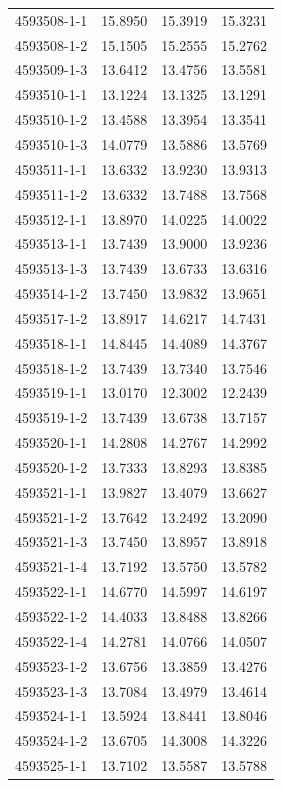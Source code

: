 \begin{longtable}{lrrr}
4593508-1-1 & 15.8950 & 15.3919 & 15.3231 \\
4593508-1-2 & 15.1505 & 15.2555 & 15.2762 \\
4593509-1-3 & 13.6412 & 13.4756 & 13.5581 \\
4593510-1-1 & 13.1224 & 13.1325 & 13.1291 \\
4593510-1-2 & 13.4588 & 13.3954 & 13.3541 \\
4593510-1-3 & 14.0779 & 13.5886 & 13.5769 \\
4593511-1-1 & 13.6332 & 13.9230 & 13.9313 \\
4593511-1-2 & 13.6332 & 13.7488 & 13.7568 \\
4593512-1-1 & 13.8970 & 14.0225 & 14.0022 \\
4593513-1-1 & 13.7439 & 13.9000 & 13.9236 \\
4593513-1-3 & 13.7439 & 13.6733 & 13.6316 \\
4593514-1-2 & 13.7450 & 13.9832 & 13.9651 \\
4593517-1-2 & 13.8917 & 14.6217 & 14.7431 \\
4593518-1-1 & 14.8445 & 14.4089 & 14.3767 \\
4593518-1-2 & 13.7439 & 13.7340 & 13.7546 \\
4593519-1-1 & 13.0170 & 12.3002 & 12.2439 \\
4593519-1-2 & 13.7439 & 13.6738 & 13.7157 \\
4593520-1-1 & 14.2808 & 14.2767 & 14.2992 \\
4593520-1-2 & 13.7333 & 13.8293 & 13.8385 \\
4593521-1-1 & 13.9827 & 13.4079 & 13.6627 \\
4593521-1-2 & 13.7642 & 13.2492 & 13.2090 \\
4593521-1-3 & 13.7450 & 13.8957 & 13.8918 \\
4593521-1-4 & 13.7192 & 13.5750 & 13.5782 \\
4593522-1-1 & 14.6770 & 14.5997 & 14.6197 \\
4593522-1-2 & 14.4033 & 13.8488 & 13.8266 \\
4593522-1-4 & 14.2781 & 14.0766 & 14.0507 \\
4593523-1-2 & 13.6756 & 13.3859 & 13.4276 \\
4593523-1-3 & 13.7084 & 13.4979 & 13.4614 \\
4593524-1-1 & 13.5924 & 13.8441 & 13.8046 \\
4593524-1-2 & 13.6705 & 14.3008 & 14.3226 \\
4593525-1-1 & 13.7102 & 13.5587 & 13.5788 \\

\end{longtable}
